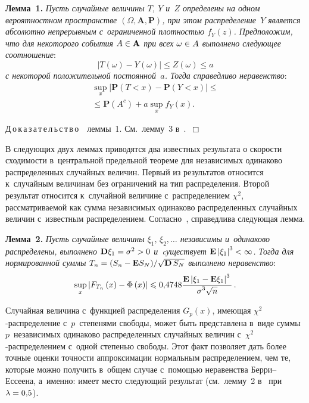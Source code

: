 \begin{multicols}{2}
\noindent
\textbf{Лемма~1.}
\textit{Пусть случайные величины $T$, $Y$ и~$Z$ определены на одном вероятностном 
пространстве $\left(\Omega,\mathbf{A},\mathbf{P}\right)$,
при этом распределение~$Y$ является абсолютно непрерывным с~ограниченной 
плотностью $f_{Y}\left(z\right)$.
Предположим, что для некоторого события $A\hm\in \mathbf{A}$ при всех $\omega\hm\in A$ 
выполнено следующее соотношение}:
$$
\left|T(\omega)-Y(\omega)\right|\leqslant Z(\omega) \leqslant a
$$
\textit{с некоторой положительной постоянной~$a$.
Тогда
справедливо неравенство}:
\begin{multline}
\label{uniform}
\sup\limits_{x}\left|\mathbf{P}(T<x)-\mathbf{P}(Y<x)\right| \leqslant{}\\
{}\leqslant \mathbf{P}(A^c) + 
a\sup\limits_{x}{f_{Y}\left(x\right)}.
\end{multline}  

\noindent
Д\,о\,к\,а\,з\,а\,т\,е\,л\,ь\,с\,т\,в\,о\ \ леммы~1. См.\ лемму~3 в~\cite{lit:LU02}.~\hfill $\Box$

В следующих двух леммах приводятся два известных результата о скорости 
сходимости в~центральной предельной теореме для независимых одинаково 
распределенных случайных величин.
Первый из результатов относится к~случайным величинам без ограничений на тип 
распределения.
Второй результат относится к~случайной величине с~распределением $\chi^{2}$, 
рассматриваемой как сумма независимых одинаково распределенных 
случайных величин с~известным распределением. Согласно~\cite{lit:Shevtsova1}, справедлива 
следующая лемма.

\noindent
\textbf{Лемма~2.}
\textit{Пусть случайные величины $\xi_{1},\,\xi_{2},\ldots$ независимы и~одинаково 
распределены, выполнено $\mathbf{D}\xi_{1}\hm=\sigma^{2}\hm>0$ и~cуществует 
$\mathbf{E}\left|\xi_{1}\right|^{3}\hm<\infty$. Тогда  для нормированной суммы}
$
T_{n}\hm=
{(S_{n}-\mathbf{E}{S_{N}})}/{\sqrt{\mathbf{D}\,{S_{N}}}}
$
\textit{выполнено неравенство}:
$$
\sup\limits_{x}{\left|F_{T_{n}}\left(x\right)-\Phi\left(x\right)\right|}\leqslant 
0{,}4748\displaystyle\frac{\displaystyle \mathbf{E}\left|\xi_{1}-
\mathbf{E}\xi_{1}\right|^{3}\mathstrut}{\displaystyle \sigma^{3}\sqrt{n}\mathstrut}\,.
$$


Случайная величина с~функцией распределения $G_{p}(x)$, имеющая   $\chi^{2}$-рас\-пре\-де\-ле\-ние 
с~$p$~степенями свободы, может быть представлена в~виде суммы~$p$~независимых 
одинаково распределенных случайных величин с~$\chi^{2}$-рас\-пре\-де\-ле\-ни\-ем с~одной степенью свободы.
Этот факт позволяет дать более точные оценки точ\-ности аппроксимации нормальным 
распределением, чем те, которые можно получить в~общем случае с~помощью
неравенства Бер\-ри--Ес\-се\-ена, а~именно: имеет место следующий результат (см.\ лемму~2 
в~\cite{lit:Kavaguchi} при $\lambda\hm=0{,}5$).


\end{multicols}
